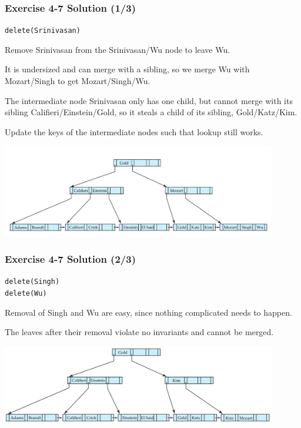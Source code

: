 \begin{frame}
\frametitle{Exercise 4-7 Solution (1/3)}

\texttt{delete(Srinivasan)}

Remove Srinivasan from the Srinivasan/Wu node to leave Wu.

It is undersized and can merge with a sibling, so we merge Wu with Mozart/Singh to get Mozart/Singh/Wu.

The intermediate node Srinivasan only has one child, but cannot merge with its sibling Califieri/Einstein/Gold, so it steals a child of its sibling, Gold/Katz/Kim.

Update the keys of the intermediate nodes such that lookup still works.

\begin{center}
  \includegraphics[width=0.9\textwidth]{images/b-tree-delete_srinivasan.png}
\end{center}

\end{frame}


\begin{frame}
\frametitle{Exercise 4-7 Solution (2/3)}

\texttt{delete(Singh)} \\
\texttt{delete(Wu)}

Removal of Singh and Wu are easy, since nothing complicated needs to happen.

The leaves after their removal violate no invariants and cannot be merged.


\begin{center}
  \includegraphics[width=0.9\textwidth]{images/b-tree-delete_singh_wu.png}
\end{center}

\end{frame}


